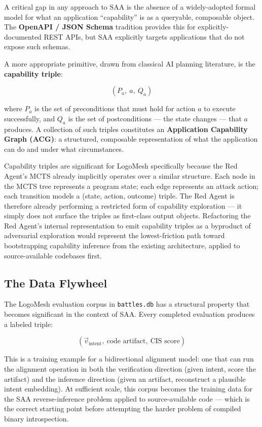 \documentclass[11pt, a4paper]{article}
\begin{document}
A critical gap in any approach to SAA is the absence of a widely-adopted formal model for what an application ``capability'' is as a queryable, composable object. The \textbf{OpenAPI / JSON Schema} tradition provides this for explicitly-documented REST APIs, but SAA explicitly targets applications that do not expose such schemas.

A more appropriate primitive, drawn from classical AI planning literature, is the \textbf{capability triple}:

\[
(P_a,\ a,\ Q_a)
\]

where $P_a$ is the set of preconditions that must hold for action $a$ to execute successfully, and $Q_a$ is the set of postconditions — the state changes — that $a$ produces. A collection of such triples constitutes an \textbf{Application Capability Graph (ACG)}: a structured, composable representation of what the application can do and under what circumstances.

Capability triples are significant for LogoMesh specifically because the Red Agent's MCTS already implicitly operates over a similar structure. Each node in the MCTS tree represents a program state; each edge represents an attack action; each transition models a (state, action, outcome) triple. The Red Agent is therefore already performing a restricted form of capability exploration — it simply does not surface the triples as first-class output objects. Refactoring the Red Agent's internal representation to emit capability triples as a byproduct of adversarial exploration would represent the lowest-friction path toward bootstrapping capability inference from the existing architecture, applied to source-available codebases first.

\subsection{The Data Flywheel}

The LogoMesh evaluation corpus in \texttt{battles.db} has a structural property that becomes significant in the context of SAA. Every completed evaluation produces a labeled triple:

\[
(\vec{v}_{\text{intent}},\ \text{code artifact},\ \text{CIS score})
\]

This is a training example for a bidirectional alignment model: one that can run the alignment operation in both the verification direction (given intent, score the artifact) and the inference direction (given an artifact, reconstruct a plausible intent embedding). At sufficient scale, this corpus becomes the training data for the SAA reverse-inference problem applied to source-available code — which is the correct starting point before attempting the harder problem of compiled binary introspection.
\end{document}
